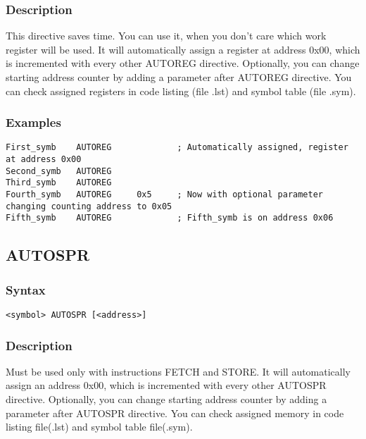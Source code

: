         \subsubsection{Description}
            This directive saves time. You can use it, when you don't care which work register will be used. It will automatically assign a register at address 0x00, which is incremented with every other AUTOREG directive. Optionally, you can change starting address counter by adding a parameter after AUTOREG directive. You can check assigned registers in code listing (file .lst) and symbol table (file .sym).

        \subsubsection{Examples}
            \verb'First_symb    AUTOREG             ; Automatically assigned, register at address 0x00'\\
            \verb'Second_symb   AUTOREG'\\
            \verb'Third_symb    AUTOREG'\\
            \verb'Fourth_symb   AUTOREG     0x5     ; Now with optional parameter changing counting address to 0x05'\\
            \verb'Fifth_symb    AUTOREG             ; Fifth_symb is on address 0x06'

    \subsection{AUTOSPR}
        \subsubsection{Syntax}
            \verb'<symbol> AUTOSPR [<address>]'

    \subsubsection{Description}
        Must be used only with instructions FETCH and STORE. It will automatically assign an address 0x00, which is incremented with every other AUTOSPR directive. Optionally, you can change starting address counter by adding a parameter after AUTOSPR directive. You can check assigned memory in code listing file(.lst) and symbol table file(.sym).

